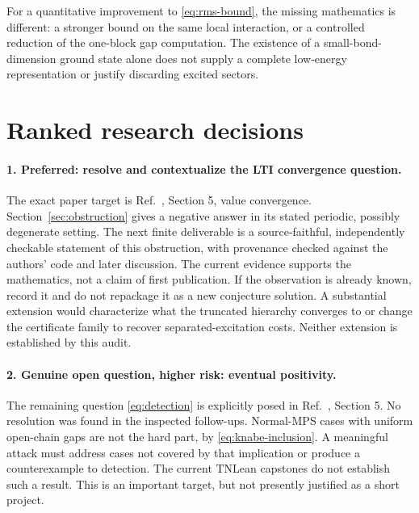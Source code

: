 \documentclass{article}
\begin{document}
For a quantitative improvement to \eqref{eq:rms-bound}, the missing
mathematics is different: a stronger bound on the same local interaction,
or a controlled reduction of the one-block gap computation. The existence
of a small-bond-dimension ground state alone does not supply a complete
low-energy representation or justify discarding excited sectors.

\section{Ranked research decisions}
\label{sec:targets}

\paragraph{1. Preferred: resolve and contextualize the LTI convergence question.}
The exact paper target is Ref.~\cite{LTI}, Section 5, value convergence.
Section~\ref{sec:obstruction} gives a negative answer in its stated
periodic, possibly degenerate setting. The next finite deliverable is a
source-faithful, independently checkable statement of this obstruction,
with provenance checked against the authors' code and later discussion.
The current evidence supports the mathematics, not a claim of first
publication. If the observation is already known, record it and do not
repackage it as a new conjecture solution. A substantial extension would
characterize what the truncated hierarchy converges to or change the
certificate family to recover separated-excitation costs. Neither extension
is established by this audit.

\paragraph{2. Genuine open question, higher risk: eventual positivity.}
The remaining question \eqref{eq:detection} is explicitly posed in
Ref.~\cite{LTI}, Section 5. No resolution was found in the inspected
follow-ups. Normal-MPS cases with uniform open-chain gaps are not the hard
part, by \eqref{eq:knabe-inclusion}. A meaningful attack must address cases
not covered by that implication or produce a counterexample to detection.
The current TNLean capstones do not establish such a result. This is an
important target, but not presently justified as a short project.
\end{document}
